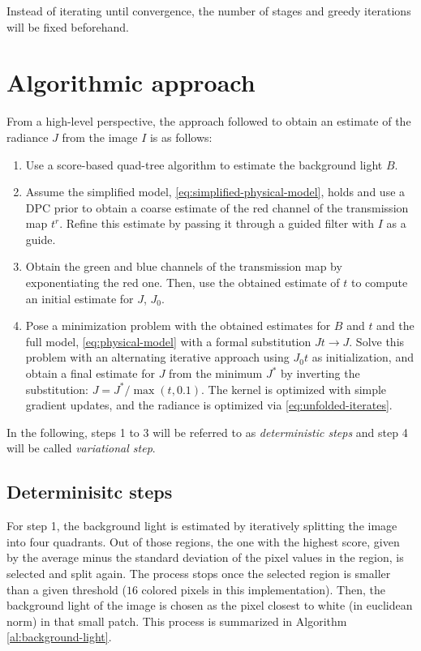 \documentclass[twocolumn,twoside,a4paper,10pt]{IEEEtran}
\begin{document}
Instead of iterating until convergence, the number of stages and greedy iterations will be fixed beforehand.

\section{Algorithmic approach}

From a high-level perspective, the approach followed to obtain an estimate of the radiance \(J\) from the image \(I\) is as follows:

\begin{enumerate}
  \item Use a score-based quad-tree algorithm to estimate the background light \(B\).
  \item Assume the simplified model, \cref{eq:simplified-physical-model}, holds and use a DPC prior to obtain a coarse estimate of the red channel of the transmission map \(t^r\). Refine this estimate by passing it through a guided filter with \(I\) as a guide.
  \item Obtain the green and blue channels of the transmission map by exponentiating the red one. Then, use the obtained estimate of \(t\) to compute an initial estimate for \(J\), \(J_0\).
  \item Pose a minimization problem with the obtained estimates for \(B\) and \(t\) and the full model, \cref{eq:physical-model} with a formal substitution \(Jt\to J\). Solve this problem with an alternating iterative approach using \(J_0t\) as initialization, and obtain a final estimate for \(J\) from the minimum \(J^*\) by inverting the substitution: \(J=J^*/\max(t, 0.1)\). The kernel is optimized with simple gradient updates, and the radiance is optimized via \cref{eq:unfolded-iterates}.
\end{enumerate}
In the following, steps 1 to 3 will be referred to as \textit{deterministic steps} and step 4 will be called \textit{variational step}.

\subsection{Determinisitc steps}
For step 1, the background light is estimated by iteratively splitting the image into four quadrants. Out of those regions, the one with the highest score, given by the average minus the standard deviation of the pixel values in the region, is selected and split again. The process stops once the selected region is smaller than a given threshold (\(16\) colored pixels in this implementation). Then, the background light of the image is chosen as the pixel closest to white (in euclidean norm) in that small patch. This process is summarized in Algorithm \ref{al:background-light}.
\end{document}
